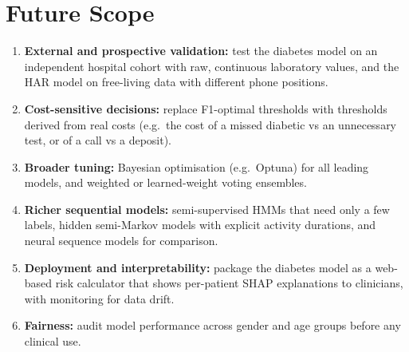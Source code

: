 \section{Future Scope}
\begin{enumerate}
\item \textbf{External and prospective validation:} test the diabetes model on an independent hospital cohort with raw,
continuous laboratory values, and the HAR model on free-living data with different phone positions.
\item \textbf{Cost-sensitive decisions:} replace F1-optimal thresholds with thresholds derived from real costs (e.g.\ the
cost of a missed diabetic vs an unnecessary test, or of a call vs a deposit).
\item \textbf{Broader tuning:} Bayesian optimisation (e.g.\ Optuna) for all leading models, and weighted or
learned-weight voting ensembles.
\item \textbf{Richer sequential models:} semi-supervised HMMs that need only a few labels, hidden semi-Markov models with
explicit activity durations, and neural sequence models for comparison.
\item \textbf{Deployment and interpretability:} package the diabetes model as a web-based risk calculator that shows
per-patient SHAP explanations to clinicians, with monitoring for data drift.
\item \textbf{Fairness:} audit model performance across gender and age groups before any clinical use.
\end{enumerate}

